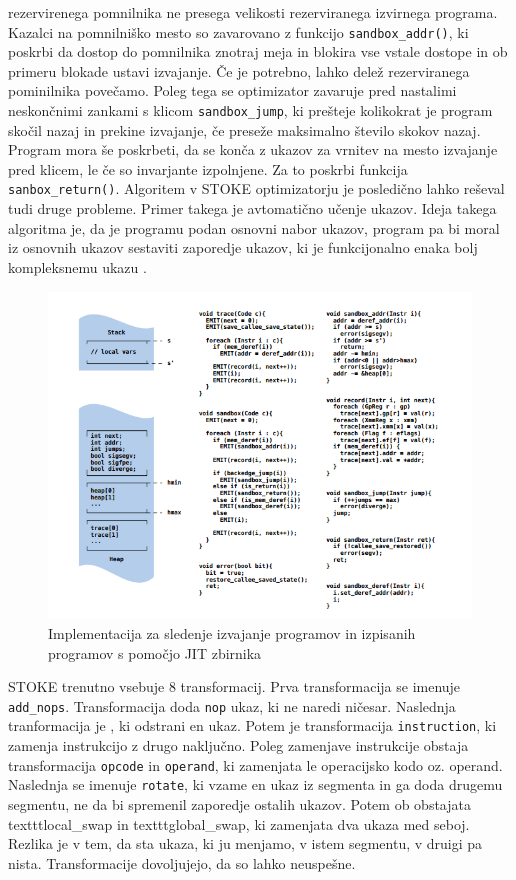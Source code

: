 \documentclass[a4paper, 12pt]{book}
\begin{document}
rezervirenega pomnilnika ne presega velikosti rezerviranega izvirnega programa. Kazalci na pomnilniško mesto so zavarovano z funkcijo \texttt{sandbox\_addr()}, ki poskrbi da dostop do pomnilnika znotraj meja in blokira vse vstale dostope in ob primeru blokade ustavi izvajanje. Če je potrebno, lahko delež rezerviranega pominilnika povečamo. Poleg tega se optimizator zavaruje pred nastalimi neskončnimi zankami s klicom \texttt{sandbox\_jump}, ki prešteje kolikokrat je program skočil nazaj in prekine izvajanje, če preseže maksimalno število skokov nazaj. Program mora še poskrbeti, da se konča z ukazov za vrnitev na mesto izvajanje pred klicem, le če so invarjante izpolnjene. Za to poskrbi funkcija \texttt{sanbox\_return()}. Algoritem v STOKE optimizatorju je posledično lahko reševal tudi druge probleme. Primer takega je avtomatično učenje ukazov. Ideja takega algoritma je, da je programu podan osnovni nabor ukazov, program pa bi moral iz osnovnih ukazov sestaviti zaporedje ukazov, ki je funkcijonalno enaka bolj kompleksnemu ukazu \cite{article4}.%
		\begin{figure}[htb]
			\begin{center}
				\includegraphics[width=15cm]{graf3.jpg}
			\end{center}
			\caption{Implementacija za sledenje izvajanje programov in izpisanih programov s pomočjo JIT zbirnika}
			\label{pic3}
		\end{figure}
	STOKE trenutno vsebuje 8 transformacij. Prva transformacija se imenuje \texttt{add\_nops}. Transformacija doda \texttt{nop} ukaz, ki ne naredi ničesar. Naslednja tranformacija je , ki odstrani en ukaz. Potem je transformacija \texttt{instruction}, ki zamenja instrukcijo z drugo naključno. Poleg zamenjave instrukcije obstaja transformacija \texttt{opcode} in \texttt{operand}, ki zamenjata le operacijsko kodo oz. operand. Naslednja se imenuje \texttt{rotate}, ki vzame en ukaz iz segmenta in ga doda drugemu segmentu, ne da bi spremenil zaporedje ostalih ukazov. Potem ob obstajata texttt{local\_swap} in texttt{global\_swap}, ki zamenjata dva ukaza med seboj. Rezlika je v tem, da sta ukaza, ki ju menjamo, v istem segmentu, v druigi pa nista. Transformacije dovoljujejo, da so lahko neuspešne.%
\end{document}
